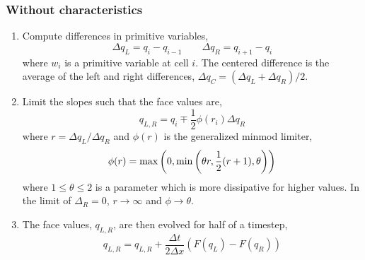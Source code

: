 \documentclass{article}
\begin{document}
\subsubsection{Without characteristics}

\begin{enumerate}
 \item Compute differences in primitive variables, 
 \begin{equation}
  \Delta q_L = q_{i} - q_{i-1} \qquad \Delta q_R = q_{i+1} - q_i
 \end{equation}
 where $w_i$ is a primitive variable at cell $i$. 
 The centered difference is the average of the left and right differences, $\Delta q_C = (\Delta q_L + \Delta q_R)/2$. 
 
 \item Limit the slopes such that the face values are,
 \begin{equation}
  q_{L,R} = q_i \mp \frac{1}{2} \phi(r_i) \Delta q_R
 \end{equation}
 where $r = \Delta q_L/\Delta q_R$ and $\phi(r)$ is the generalized minmod limiter,
 \begin{equation}
  \phi(r) = {\rm max}\left(0, {\rm min}\left(\theta r, \frac{1}{2} (r +1), \theta \right) \right)
 \end{equation}
 where $1 \le \theta \le 2$ is a parameter which is more dissipative for higher values. 
 In the limit of $\Delta_R =0$, $r\rightarrow \infty$ and $\phi \rightarrow \theta$. 
 
 \item The face values, $q_{L,R}$, are then evolved for half of a timestep, 
 \begin{equation}
    q_{L,R} = q_{L,R} + \frac{\Delta t}{2 \Delta x} \left( F(q_L) - F(q_R) \right)  
 \end{equation}


\end{enumerate}
\end{document}
